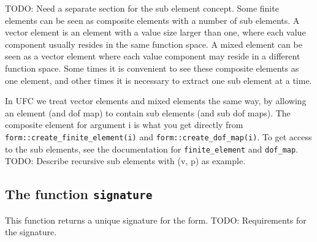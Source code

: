 TODO: Need a separate section for the sub element concept.
Some finite elements can be seen as composite elements with a number of sub elements.
A vector element is an element with a value size larger than one,
where each value component usually resides in the same function space.
A mixed element can be seen as a vector element where each value
component may reside in a different function space.
Some times it is convenient to see these composite elements as one element,
and other times it is necessary to extract one sub element at a time.

In UFC we treat vector elements and mixed elements the same way, by allowing
an element (and dof map) to contain sub elements (and sub dof maps).
The composite element for argument i is what you get directly from
\texttt{form::create\_finite\_element(i)} and \texttt{form::create\_dof\_map(i)}.
To get access to the sub elements, see the documentation for
\texttt{finite\_element} and \texttt{dof\_map}.
TODO: Describe recursive sub elements with (v, p) as example.






\subsection{The function \texttt{signature}}
This function returns a unique signature for the form.
TODO: Requirements for the signature.



